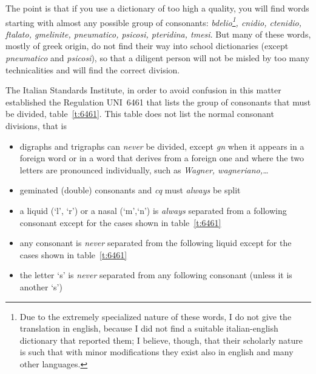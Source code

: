 \documentclass{ltugboat}
\begin{document}
The  point  is  that if you use a dictionary of too high a quality, you will
find words starting with almost  any  possible  group  of  consonants:  {\it
bdelio\footnote{Due to the extremely specialized nature of these words, I do
not give the translation in english, because  I  did  not  find  a  suitable
italian-english dictionary that reported them; I believe, though, that their
scholarly nature is such that with minor modifications they  exist  also  in
english  and  many  other languages.}, cnidio, ctenidio, ftalato, gmelinite,
pneumatico, psicosi, pteridina, tmesi}. But many of these words,  mostly  of
greek  origin,  do  not find their way into school dictionaries (except {\it
pneumatico} and {\it psicosi\/}), so that a  diligent  person  will  not  be
misled by too many technicalities and will find the correct division.

The  Italian Standards Institute, in order to avoid confusion in this matter
established the Regulation UNI~6461 \cite{6461}  that  lists  the  group  of
consonants  that  must  be  divided, table~\ref{t:6461}. This table does not
list the normal consonant divisions, that is
 \begin{itemize}

\item  digraphs  and  trigraphs  can {\it never} be divided, except {\it gn}
when it appears in a foreign word or in a word that derives from  a  foreign
one  and  where  the  two  letters are pronounced individually, such as {\it
Wagner, wagneriano,\dots}

\item geminated (double) consonants and {\it cq} must {\it always} be split

\item  a  liquid  (`l',  `r') or a nasal (`m',`n') is {\it always} separated
from a following consonant except for the cases shown in table~\ref{t:6461}

\item  any  consonant  is  {\it  never}  separated from the following liquid
except for the cases shown in table~\ref{t:6461}

\item  the  letter `s' is {\it never} separated from any following consonant
(unless it is another `s')

\end{itemize}
\end{document}
